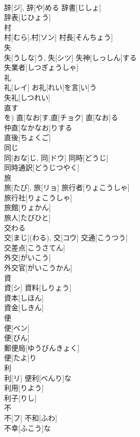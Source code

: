 \documentclass[8pt]{extreport}
\begin{document}
\begin{CJK}{UTF8}{min}
\\	辞[ジ], 辞[や]める	辞書[じしょ]　
\\	辞表[じひょう] 
\\	村	
\\	村[むら],村[ソン]	村長[そんちょう] 
\\	失	
\\	失[うしな]う, 失[シツ]	失神[しっしん]する 
\\	失業者[しつぎょうしゃ] 
\\	礼	
\\	礼[レイ]	お礼[れい]を言[い]う 
\\	失礼[しつれい] 
\\	直す	
\\	を)	直[なお]す,直[チョク]	直[なお]る 
\\	仲直[なかなお]りする　
\\	直後[ちょくご] 
\\	同じ	
\\	同[おな]じ, 同[ドウ]	同時[どうじ] 
\\	同時通訳[どうじつやく]　
\\	旅	
\\	旅[たび], 旅[リョ]	旅行者[りょこうしゃ] 
\\	旅行社[りょこうしゃ] 
\\	旅館[りょかん] 
\\	旅人[たびひと] 
\\	交わる	
\\	交[まじ](わる), 交[コウ]	交通[こうつう] 
\\	交差点[こうさてん] 
\\	外交[がいこう] 
\\	外交官[がいこうかん] 
\\	資	
\\	資[シ]	資料[しりょう] 
\\	資本[しほん] 
\\	資金[しきん] 
\\	便	
\\	便[ベン]	
\\	便[びん] 
\\	郵便局[ゆうびんきょく] 
\\	便[たよ]り 
\\	利	
\\	利[リ]	便利[べんり]な　
\\	利用[りよう] 
\\	利子[りし] 
\\	不	
\\	不[フ]	不和[ふわ] 
\\	不幸[ふこう]な 

\end{CJK}
\end{document}

